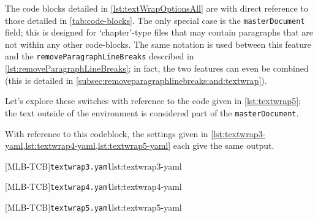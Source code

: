 	The code blocks detailed in \cref{lst:textWrapOptionsAll} are with direct reference to
	those detailed in \vref{tab:code-blocks}. The only special case is the
	\texttt{masterDocument} field; this is designed for `chapter'-type files that may
	contain paragraphs that are not within any other code-blocks. The same notation is used
	between this feature and the \texttt{removeParagraphLineBreaks} described in
	\vref{lst:removeParagraphLineBreaks}; in fact, the two features can even be combined (this is
	detailed in \vref{subsec:removeparagraphlinebreaks:and:textwrap}).

	Let's explore these switches with reference to the code given in
	\cref{lst:textwrap5}; the text outside of the environment is considered part of
	the \texttt{masterDocument}.

	\begin{widepage}
	\end{widepage}

	With reference to this codeblock, the settings given in \cref{lst:textwrap3-yaml,lst:textwrap4-yaml,lst:textwrap5-yaml} each
	give the same output.

	\begin{adjustwidth}{-3.5cm}{-2.5cm}
		\begin{minipage}{.33\linewidth}
			{\texttt{textwrap3.yaml}}{lst:textwrap3-yaml}
		\end{minipage}%
		\begin{minipage}{.33\linewidth}
			{\texttt{textwrap4.yaml}}{lst:textwrap4-yaml}
		\end{minipage}%
		\begin{minipage}{.33\linewidth}
			{\texttt{textwrap5.yaml}}{lst:textwrap5-yaml}
		\end{minipage}
	\end{adjustwidth}

